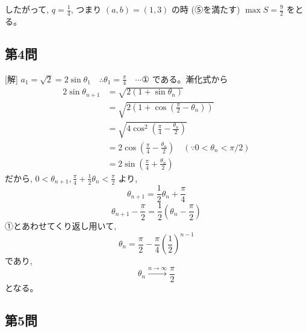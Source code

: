 \documentclass[../main.tex]{subfiles}
\begin{document}
したがって, $q = \frac{1}{4}$, つまり $(a, b) = (1, 3)$ の時 (⑤を満たす) $\max S = \frac{9}{2}$ をとる。

\begin{center}
\end{center}

\subsection*{第4問}

[解] $a_1 = \sqrt{2} = 2 \sin \theta_1 \quad \therefore \theta_1 = \frac{\pi}{4} \quad \cdots \text{①}$ である。漸化式から
\[
  \begin{aligned}
    2 \sin \theta_{n+1} &= \sqrt{2 (1 + \sin \theta_n)} \\
    &= \sqrt{2 \left( 1 + \cos \left(\frac{\pi}{2} - \theta_n\right) \right)} \\
    &= \sqrt{4 \cos^2 \left( \frac{\pi}{4} - \frac{\theta_n}{2} \right)} \\
    &= 2 \cos \left( \frac{\pi}{4} - \frac{\theta_n}{2} \right) \quad (\because 0 < \theta_n < \pi/2) \\
    &= 2 \sin \left( \frac{\pi}{4} + \frac{\theta_n}{2} \right)
  \end{aligned}
\]
だから, $0 < \theta_{n+1}, \frac{\pi}{4} + \frac{1}{2}\theta_n < \frac{\pi}{2}$ より,
\[
  \theta_{n+1} = \frac{1}{2}\theta_n + \frac{\pi}{4}
\]
\[
  \theta_{n+1} - \frac{\pi}{2} = \frac{1}{2} \left( \theta_n - \frac{\pi}{2} \right)
\]
①とあわせてくり返し用いて,
\[
  \theta_n = \frac{\pi}{2} - \frac{\pi}{4} \left(\frac{1}{2}\right)^{n-1}
\]
であり,
\[
  \theta_n \xrightarrow{n \to \infty} \frac{\pi}{2}
\]
となる。

\subsection*{第5問}
\end{document}
